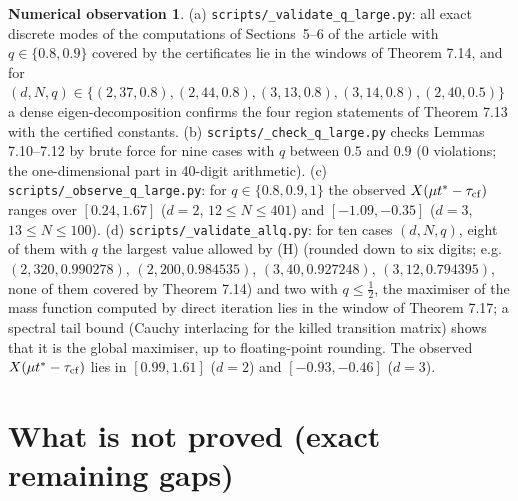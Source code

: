 \documentclass[11pt,a4paper]{article}
\theoremstyle{definition}
\newtheorem{observation}[theorem]{Numerical observation}
\theoremstyle{remark}
\begin{document}
\begin{observation}
(a) \texttt{scripts/\_\allowbreak validate\_\allowbreak q\_\allowbreak large.py}: all exact discrete modes of the computations of Sections~5--6 of the article with $q\in\{0.8,0.9\}$ covered by the certificates lie in the windows of Theorem 7.14, and for $(d,N,q)\in\{(2,37,0.8),(2,44,0.8),(3,13,0.8),(3,14,0.8),(2,40,0.5)\}$ a dense eigen-decomposition confirms the four region statements of Theorem 7.13 with the certified constants. (b) \texttt{scripts/\_\allowbreak check\_\allowbreak q\_\allowbreak large.py} checks Lemmas 7.10–7.12 by brute force for nine cases with $q$ between $0.5$ and $0.9$ (0 violations; the one-dimensional part in 40-digit arithmetic). (c) \texttt{scripts/\_\allowbreak observe\_\allowbreak q\_\allowbreak large.py}: for $q\in\{0.8,0.9,1\}$ the observed $X(\mu t^*-\tau_{\rm cf})$ ranges over $[0.24,1.67]$ ($d=2$, $12\le N\le401$) and $[-1.09,-0.35]$ ($d=3$, $13\le N\le100$). (d) \texttt{scripts/\_\allowbreak validate\_\allowbreak allq.py}: for ten cases $(d,N,q)$, eight of them with $q$ the largest value allowed by (H) (rounded down to six digits; e.g. $(2,320,0.990278)$, $(2,200,0.984535)$, $(3,40,0.927248)$, $(3,12,0.794395)$, none of them covered by Theorem 7.14) and two with $q\le\frac12$, the maximiser of the mass function computed by direct iteration lies in the window of Theorem 7.17; a spectral tail bound (Cauchy interlacing for the killed transition matrix) shows that it is the global maximiser, up to floating-point rounding. The observed $X(\mu t^*-\tau_{\rm cf})$ lies in $[0.99,1.61]$ ($d=2$) and $[-0.93,-0.46]$ ($d=3$).
\end{observation}

\setcounter{section}{7}
\section{What is not proved (exact remaining gaps)}
\end{document}
